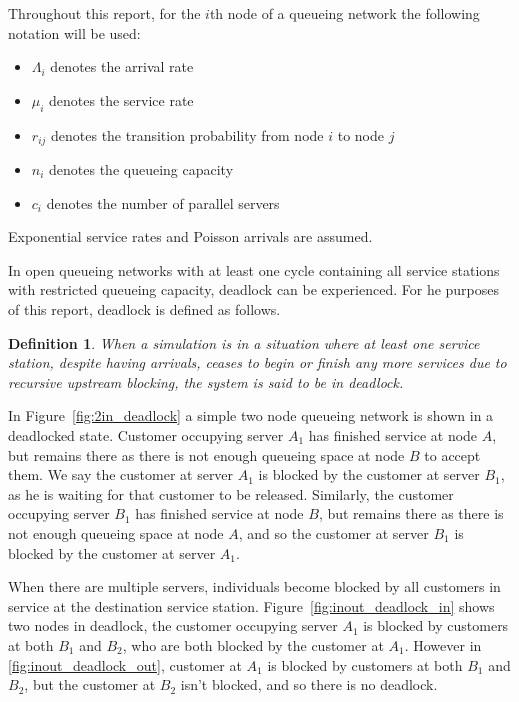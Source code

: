 \documentclass{article}
\newtheorem{definition}{Definition}
\begin{document}
Throughout this report, for the $i$th node of a queueing network the following notation will be used:

\begin{itemize}
  \item $\Lambda_i$ denotes the arrival rate
  \item $\mu_i$ denotes the service rate
  \item $r_{ij}$ denotes the transition probability from node $i$ to node $j$
  \item $n_i$ denotes the queueing capacity
  \item $c_i$ denotes the number of parallel servers
\end{itemize}

Exponential service rates and Poisson arrivals are assumed.

In open queueing networks with at least one cycle containing all service stations with restricted queueing capacity, deadlock can be experienced.
For he purposes of this report, deadlock is defined as follows.\\

\begin{definition}
    When a simulation is in a situation where at least one service station,
    despite having arrivals, ceases to begin or finish any more services
    due to recursive upstream blocking, the system is said to be in deadlock.
\end{definition}

In Figure~\ref{fig:2in_deadlock} a simple two node queueing network is shown in a deadlocked state.
Customer occupying server $A_1$ has finished service at node $A$, but remains there as there is not
enough queueing space at node $B$ to accept them.
We say the customer at server $A_1$ is blocked by the customer at server $B_1$, as he is waiting for that customer to be released.
Similarly, the customer occupying server $B_1$ has finished service at node $B$, but remains there as there is not enough queueing space at node $A$, and so the customer at server $B_1$ is blocked by the customer at server $A_1$.

When there are multiple servers, individuals become blocked by all customers in
service at the destination service station.
Figure~\ref{fig:inout_deadlock_in} shows two nodes in deadlock, the customer occupying server $A_1$ is blocked by customers at both $B_1$ and $B_2$, who are both blocked by the customer at $A_1$.
However in \ref{fig:inout_deadlock_out}, customer at $A_1$ is blocked by customers at both $B_1$ and $B_2$, but the customer at $B_2$ isn't blocked, and so there is no deadlock.
\end{document}
